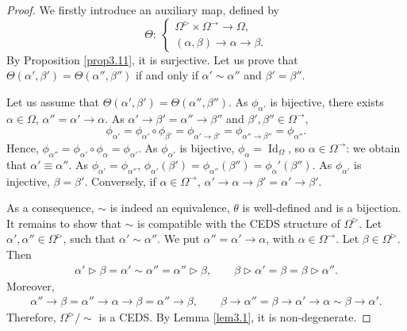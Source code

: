 \documentclass[10pt,a4paper]{amsart}
\numberwithin{equation}{section}
\begin{document}
\begin{proof} We firstly introduce an auxiliary map, defined by
\[\Theta\colon \ \begin{cases}
\Omega^\triangleright \times \Omega^\rightarrow \longrightarrow \Omega,\\
(\alpha,\beta) \longrightarrow \alpha \rightarrow \beta.
\end{cases}\]
By Proposition \ref{prop3.11}, it is surjective. Let us prove that $\Theta(\alpha',\beta')=\Theta(\alpha'',\beta'')$ if and only if $\alpha'\sim \alpha''$ and $\beta'=\beta''$.

Let us assume that $\Theta(\alpha',\beta')=\Theta(\alpha'',\beta'')$. As $\phi_{\alpha'}$ is bijective, there exists $\alpha \in \Omega$, $\alpha''=\alpha'\rightarrow \alpha$.
As $\alpha'\rightarrow \beta'=\alpha''\rightarrow \beta''$ and $\beta',\beta''\in \Omega^\rightarrow$,
\[\phi_{\alpha'}=\phi_{\alpha'}\circ \phi_{\beta'}=\phi_{\alpha'\rightarrow \beta'}=\phi_{\alpha''\rightarrow \beta''}=\phi_{\alpha''}.\]
Hence,
$\phi_{\alpha''}=\phi_{\alpha'}\circ \phi_{\alpha}=\phi_{\alpha'}$.
As $\phi_{\alpha'}$ is bijective, $\phi_\alpha=\operatorname{Id}_\Omega$, so $\alpha \in \Omega^\rightarrow$: we obtain that $\alpha'\equiv \alpha''$. As $\phi_{\alpha'}=\phi_{\alpha''}$, $\phi_{\alpha'}(\beta')=\phi_{\alpha''}(\beta'')=\phi_\alpha'(\beta'')$.
As $\phi_{\alpha'}$ is injective, $\beta=\beta'$. Conversely, if $\alpha \in \Omega^\rightarrow$, $\alpha'\rightarrow \alpha \rightarrow\beta'=\alpha'\rightarrow \beta'$.

As a consequence, $\sim$ is indeed an equivalence, $\theta$ is well-defined and is a bijection. It remains to show that $\sim$ is compatible with the CEDS structure of $\Omega^\triangleright$.
Let $\alpha',\alpha''\in \Omega^\triangleright$, such that $\alpha' \sim \alpha''$. We put $\alpha''=\alpha'\rightarrow \alpha$, with $\alpha \in \Omega^\rightarrow$. Let $\beta \in \Omega^\triangleright$. Then
\begin{align*}
\alpha'\triangleright \beta=\alpha'\sim \alpha''=\alpha''\triangleright \beta,\qquad\beta \triangleright \alpha'=\beta=\beta \triangleright \alpha''.
\end{align*}
Moreover,
\begin{align*}
\alpha''\rightarrow \beta=\alpha''\rightarrow \alpha \rightarrow \beta=\alpha''\rightarrow \beta,\qquad\beta \rightarrow \alpha''=\beta \rightarrow \alpha'\rightarrow \alpha\sim \beta \rightarrow \alpha'.
\end{align*}
Therefore, $\Omega^\triangleright/{\sim}$ is a CEDS. By Lemma \ref{lem3.1}, it is non-degenerate.


\end{proof}
\end{document}
